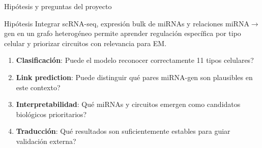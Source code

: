 \begin{frame}{Hip\'otesis y preguntas del proyecto}
  \begin{block}{Hip\'otesis}
    Integrar scRNA-seq, expresi\'on bulk de miRNAs y relaciones miRNA$\rightarrow$gen en un grafo heterog\'eneo permite aprender regulaci\'on espec\'ifica por tipo celular y priorizar circuitos con relevancia para EM.
  \end{block}

  \vspace{0.5em}

  \begin{enumerate}
    \item \textbf{Clasificaci\'on}: \textquestiondown{}Puede el modelo reconocer correctamente 11 tipos celulares?
    \item \textbf{Link prediction}: \textquestiondown{}Puede distinguir qu\'e pares miRNA-gen son plausibles en este contexto?
    \item \textbf{Interpretabilidad}: \textquestiondown{}Qu\'e miRNAs y circuitos emergen como candidatos biol\'ogicos prioritarios?
    \item \textbf{Traducci\'on}: \textquestiondown{}Qu\'e resultados son suficientemente estables para guiar validaci\'on externa?
  \end{enumerate}
\end{frame}

